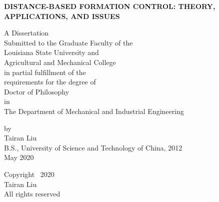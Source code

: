 \documentclass[12pt,letterpaper]{lsuetdmod}
\numberwithin{thm}{chapter}
\numberwithin{lem}{chapter}
\numberwithin{cor}{chapter}
\numberwithin{defn}{chapter}
\numberwithin{cond}{chapter}
\numberwithin{rmk}{chapter}
\begin{document}
\renewcommand\@pnumwidth{1.55em}
\renewcommand\@tocrmarg{9.55em}
\renewcommand*\l@chapter{\@dottedtocline{0}{1.5em}{2.3em}}
\renewcommand*\l@figure{\@dottedtocline{1}{0em}{3.1em}}
\let\l@table\l@figure

\thispagestyle{empty}
\begin{center}
\newcommand{\titlesize}{\fontsize{16pt}{20pt}\selectfont}
{\bfseries\titlesize DISTANCE-BASED FORMATION CONTROL: THEORY, APPLICATIONS, AND ISSUES}

\vfill
\doublespacing
A Dissertation \\
\singlespacing
Submitted to the Graduate Faculty of the \\
Louisiana State University and \\
Agricultural and Mechanical College \\
in partial fulfillment of the \\
requirements for the degree of \\
Doctor of Philosophy \\
\doublespacing
in \\
                                       
The Department of Mechanical and Industrial Engineering \\
\singlespacing
\vfill

by \\
Tairan Liu \\
B.S., University of Science and Technology of China, 2012  \\
May 2020
\end{center}
\pagebreak



\thispagestyle{empty}
\begin{center}
	\vspace*{\fill}
	\doublespacing
	Copyright \textcopyright \ 2020 \\
	Tairan Liu \\
	All rights reserved\\
	\vspace*{\fill}
\end{center}

\pagebreak
\end{document}
